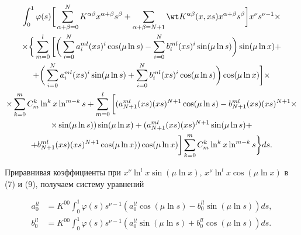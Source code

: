 \begin{multline} 


\int^1_0\varphi(s)\bigg[\sum^N_{\alpha+\beta=0} 


K^{\alpha\beta}x^{\alpha+\beta}s^\beta+\sum_{\alpha+\beta=N+1} 


\wt K{}^{\alpha\beta}(x,xs)x^{\alpha+\beta}s^\beta\bigg] 


x^\nu s^{\nu-1}\times \\ 


% 


\times\bigg\{\sum^l_{m=0}\bigg[\bigg(\sum^N_{i=0} 


a^{ml}_i(xs)^i\cos(\mu\ln s)-\sum^N_{i=0}b^{ml}_i(xs)^i\sin(\mu\ln s) 


\bigg)\sin(\mu\ln x)+\\ 


% 


+\bigg(\sum^N_{i=0}a^{ml}_i(xs)^i\sin(\mu\ln s)+ 


\sum^N_{i=0}b^{ml}_i(xs)^i\cos(\mu\ln s)\bigg)\cos(\mu\ln x)\bigg]\times\\ 


% 


\times\sum^m_{k=0}C^k_m\ln^k x\ln^{m-k}s+\sum^l_{m=0} 


\bigg[(a^{ml}_{N+1}(xs)(xs)^{N+1}\cos(\mu\ln s)- 


b^{ml}_{N+1}(xs)(xs)^{N+1}\times \\ 


% 


\times\sin(\mu\ln s))\sin(\mu\ln x)+(a^{ml}_{N+1}(xs) 


(xs)^{N+1}\sin(\mu\ln s) +\\ 


% 


+b^{ml}_{N+1}(xs)(xs)^{N+1}\cos(\mu\ln x))\cos(\mu\ln x)\bigg] 


\sum^m_{k=0}C^k_m\ln^k x\ln^{m-k}s\bigg\}ds. 


\end{multline} 


 


Приравнивая коэффициенты при $x^\nu\ln^l x\sin(\mu\ln x)$, $x^\nu\ln^l 


x\cos(\mu\ln x)$ в (7) и (9), получаем систему уравнений 


\begin{equation} 


\begin{split} 


a^{ll}_0&=K^{00}\int^1_0\varphi(s)s^{\nu-1} 


(a^{ll}_0\cos(\mu\ln s)-b^{ll}_0\sin(\mu\ln s))ds,\\ 


% 


b^{ll}_0&=K^{00}\int^1_0\varphi(s)s^{\nu-1} 


(a^{ll}_0\sin(\mu\ln s)+b^{ll}_0\cos(\mu\ln s))ds.


\end{split} 


\end{equation} 


